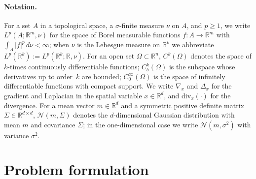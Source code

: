 \documentclass[11pt,leqno]{article}
\theoremstyle{plain}
\theoremstyle{remark}
\theoremstyle{definition}
\numberwithin{equation}{section}
\numberwithin{figure}{section}
\numberwithin{table}{section}
\begin{document}
\paragraph{Notation.}
For a set $A$ in a topological space, a $\sigma$-finite measure $\nu$ on $A$,
and $p\ge 1$, we write $L^p(A;\mathbb{R}^m,\nu)$ for the space of
Borel measurable functions $f\colon A\to\mathbb{R}^m$ with
$\int_A|f|^p\,d\nu<\infty$; when $\nu$ is the Lebesgue measure on
$\mathbb{R}^k$ we abbreviate $L^p(\mathbb{R}^k):=L^p(\mathbb{R}^k;\mathbb{R},\nu)$.
For an open set $\Omega\subset\mathbb{R}^n$, $C^k(\Omega)$ denotes the space
of $k$-times continuously differentiable functions;
$C^k_b(\Omega)$ is the subspace whose derivatives up to order~$k$ are
bounded; $C_0^\infty(\Omega)$ is the space of infinitely differentiable
functions with compact support.
We write $\nabla_x$ and $\Delta_x$ for the gradient and Laplacian in
the spatial variable $x\in\mathbb{R}^d$, and
$\mathrm{div}_x(\cdot)$ for the divergence.
For a mean vector $m\in\mathbb{R}^d$ and a symmetric positive definite
matrix $\Sigma\in\mathbb{R}^{d\times d}$, $\mathcal{N}(m,\Sigma)$
denotes the $d$-dimensional Gaussian distribution with mean $m$ and
covariance $\Sigma$; in the one-dimensional case we write
$\mathcal{N}(m,\sigma^2)$ with variance $\sigma^2$.

\section{Problem formulation}
\label{sec:2}
\end{document}

